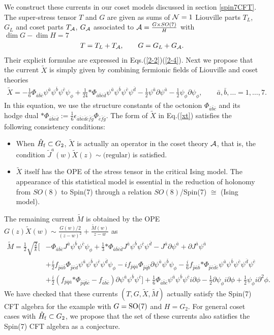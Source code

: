\documentclass[a4paper,12pt]{article}
\numberwithin{equation}{section}
\newcommand{\Ncal}{{\cal N}}
\newcommand{\del}{\partial}
\newcommand{\Acal}{{\cal A}}
\newcommand{\nn}{\nonumber}
\newcommand{\Xt}{\tilde{X}}
\newcommand{\Mt}{\tilde{M}}
\newcommand{\Phis}{{*\Phi}}
\newcommand{\Spin}[1]{{\rm Spin}(#1)}
\newcommand{\SO}[1]{{\rm SO}(#1)}
\newcommand{\psil}{\psi_{\phi}}
\newcommand{\Jh}{J}
\newcommand{\Jt}{\tilde{J}}
\newcommand{\Hf}{\hat{H}_{\rm f}}
\newcommand{\h}[1]{#1}
\newcommand{\gh}[1]{\bar{#1}}
\renewcommand{\aa}{\h a}
\newcommand{\ab}{\gh a}
\newcommand{\bb}{\gh b}
\newcommand{\cb}{\gh c}
\newcommand{\db}{\gh d}
\newcommand{\eb}{\gh e}
\newcommand{\fb}{\gh f}
\newcommand{\gb}{\gh g}
\newcommand{\pb}{\gh p}
\newcommand{\qb}{\gh q}
\begin{document}
We construct these currents in our coset models 
discussed 
in section \ref{spin7CFT}. 
The super-stress tensor $T$ and $G$ are given
as sums of $\Ncal=1$ Liouville parts $T_L$, $G_L$ and coset parts 
$T_{\cal A}$, $G_{\cal A}$ associated to
${\cal A}=\frac{G\times SO(7)}{H}$ with $\dim G-\dim H=7$
\begin{align*}
 T=T_{L}+T_{\Acal},\qquad G=G_{L}+G_{\Acal}.
\end{align*}
Their explicit formulae are expressed in Eqs.(\ref{2-2})(\ref{2-4}).
Next we propose that the current $\Xt$ is simply given 
by combining fermionic fields of Liouville and coset theories
\begin{align}
 \Xt=-\frac16 \Phi_{\ab\bb\cb}\psi^{\ab}\psi^{\bb}\psi^{\cb}\psil
+\frac{1}{24}\Phis_{\ab\bb\cb\db}\psi^{\ab}\psi^{\bb}\psi^{\cb}\psi^{\db}
-\frac12 \psi^{\ab}\del \psi^{\ab}-\frac12 \psil\del\psil,\qquad
\ab,\bb,\dots=1,\dots,7.\label{xt}
\end{align}
In this equation, we use the structure constants of the octonion 
$\Phi_{\ab\bb\cb}$ and its hodge dual $\Phis_{\ab\bb\cb\db}:=\frac16 
\epsilon_{\ab\bb\cb\db\eb\fb\gb}\Phi_{\eb\fb\gb}$. The form of $\Xt$ in 
Eq.(\ref{xt}) satisfies the following consistency conditions:
\begin{itemize}
 \item When $\Hf\subset 
G_2$, $\Xt$ is actually an operator in the coset theory $\Acal$, that is, 
the condition $\Jt^{\aa}(w)\Xt(z)\sim \text{(regular)}$ is satisfied.
 \item $\Xt$ itself has the OPE of the stress tensor in the 
 critical Ising model. The appearance of this statistical model is
       essential in the reduction of holonomy from $SO(8)$ to 
\Spin 7 through a relation $SO(8)$/\Spin 7 $\cong$ (Ising model).
\end{itemize}

The remaining current $\Mt$ is obtained by the OPE 
$G(z)\Xt(w)\sim \frac{G(w)/2}{(z-w)^2}+\frac{\tilde{M}(w)}{z-w}$ as
\begin{align}
 \Mt=\frac12\sqrt{\frac2k}\Bigg[&
-\Phi_{\ab\bb\cb}\Jh^{\ab}\psi^{\bb}\psi^{\cb}\psil
+\frac13 \Phis_{\ab\bb\cb\db}\Jh^{\ab}\psi^{\bb}\psi^{\cb}\psi^{\db}
-\Jh^{\ab}\del\psi^{\ab}
+\del\Jh^{\ab}\psi^{\ab}\nn\\
&+\frac{i}{2}f_{\pb\ab\bb}\Phi_{\pb\cb\db}
               \psi^{\ab}\psi^{\bb}\psi^{\cb}\psi^{\db}\psil
-if_{\pb\qb\ab}\Phi_{\pb\qb\bb}\del\psi^{\ab}\psi^{\bb}\psil
-\frac{i}{6}f_{\pb\ab\bb}\Phis_{\pb\cb\db\eb}
               \psi^{\ab}\psi^{\bb}\psi^{\cb}\psi^{\db}\psi^{\eb}\nn\\
&+\frac{i}{2}\left(f_{\pb\qb\ab}\Phis_{\pb\qb\bb\cb}-f_{\ab\bb\cb}\right)
          \del\psi^{\ab}\psi^{\bb}\psi^{\cb}
\Bigg]
+\frac16 \Phi_{\ab\bb\cb}\psi^{\ab}\psi^{\bb}\psi^{\cb}i\del\phi
-\frac12 \del \psil i\del\phi
+\frac12 \psil i\del^2 \phi.
\end{align}
We have checked that these currents $(T,G,\Xt,\Mt)$ actually satisfy the 
\Spin 7 CFT algebra for the example 
with $G=\SO7$ and $ H=G_2$. For general coset cases with 
$\Hf\subset G_2$, we propose
that the set of these currents 
also satisfies the \Spin 7 CFT algebra as a conjecture.
\end{document}

